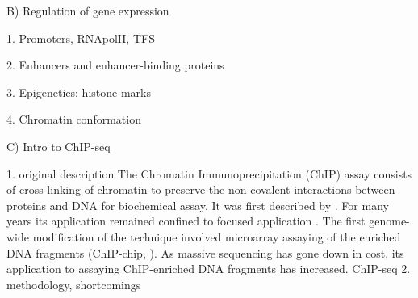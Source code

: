 B) Regulation of gene expression

	1. Promoters, RNApolII, TFS

	2. Enhancers and enhancer-binding proteins

	3. Epigenetics: histone marks

	4. Chromatin conformation

C) Intro to ChIP-seq

	1. original description
		The Chromatin Immunoprecipitation (ChIP) assay consists of cross-linking of chromatin to preserve the non-covalent interactions between proteins and DNA for biochemical assay. It was first described by \cite{Solomon1988}. For many years its application remained confined to focused application \cite{Mardis2007}.  
		The first genome-wide modification of the technique involved microarray assaying of the enriched DNA fragments (ChIP-chip, \cite{Ren2000}). As massive sequencing has gone down in cost, its application to assaying ChIP-enriched DNA fragments has increased. ChIP-seq \cite{Robertson2007}
	2. methodology, shortcomings




